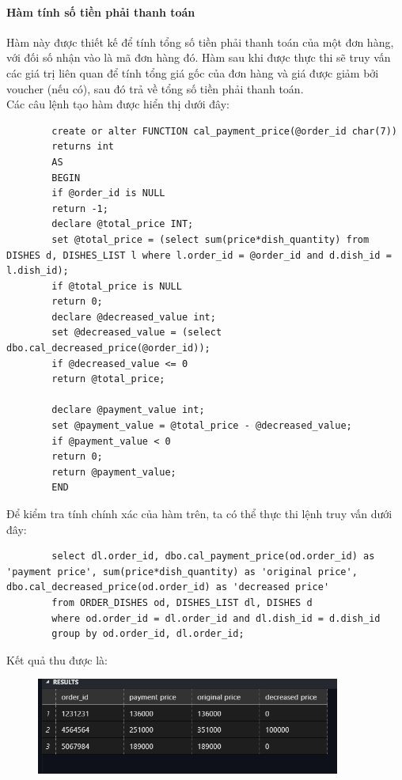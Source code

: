 \documentclass[13pt,a4paper]{article}
\begin{document}
	\paragraph{Hàm tính số tiền phải thanh toán\\}
	Hàm này được thiết kế để tính tổng số tiền phải thanh toán của một đơn hàng, với đối số nhận vào là mã đơn hàng đó. Hàm sau khi được thực thi sẽ truy vấn các giá trị liên quan để tính tổng giá gốc của đơn hàng và giá được giảm bởi voucher (nếu có), sau đó trả về tổng số tiền phải thanh toán. \\
	Các câu lệnh tạo hàm được hiển thị dưới đây:
	\begin{lstlisting}
		create or alter FUNCTION cal_payment_price(@order_id char(7))
		returns int
		AS
		BEGIN
		if @order_id is NULL
		return -1;
		declare @total_price INT;
		set @total_price = (select sum(price*dish_quantity) from DISHES d, DISHES_LIST l where l.order_id = @order_id and d.dish_id = l.dish_id);
		if @total_price is NULL
		return 0;
		declare @decreased_value int;
		set @decreased_value = (select dbo.cal_decreased_price(@order_id));
		if @decreased_value <= 0
		return @total_price;
		
		declare @payment_value int;
		set @payment_value = @total_price - @decreased_value;
		if @payment_value < 0
		return 0;
		return @payment_value;
		END
	\end{lstlisting}
	Để kiểm tra tính chính xác của hàm trên, ta có thể thực thi lệnh truy vấn dưới đây:
	\begin{lstlisting}
		select dl.order_id, dbo.cal_payment_price(od.order_id) as 'payment price', sum(price*dish_quantity) as 'original price', dbo.cal_decreased_price(od.order_id) as 'decreased price'
		from ORDER_DISHES od, DISHES_LIST dl, DISHES d
		where od.order_id = dl.order_id and dl.dish_id = d.dish_id
		group by od.order_id, dl.order_id;
	\end{lstlisting}
	Kết quả thu được là:
	\begin{figure}[h!]
		\begin{center}
			\includegraphics[width=10cm]{vitran/f_pp.png}
		\end{center}
	\end{figure}
	
\end{document}
